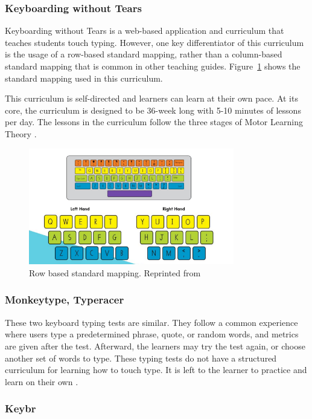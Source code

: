 \documentclass{report}
\begin{document}
\subsubsection{Keyboarding without Tears}

Keyboarding without Tears is a web-based application and curriculum that teaches
students touch typing. However, one key differentiator of this curriculum is the
usage of a row-based standard mapping, rather than a column-based standard
mapping that is common in other teaching guides. Figure~\ref{fig:kwt} shows the
standard mapping used in this curriculum.

This curriculum is self-directed and learners can learn at their own pace. At
its core, the curriculum is designed to be 36-week long with 5-10 minutes of
lessons per day. The lessons in the curriculum follow the three stages of
Motor Learning Theory \parencite{kwt}.

\begin{figure}[H]
	\centering
	\includegraphics[width=0.8\textwidth]{kwt.png}
	\caption{Row based standard mapping. Reprinted from }
	\label{fig:kwt}
	\centering
\end{figure}


\subsubsection{Monkeytype, Typeracer}

These two keyboard typing tests are similar. They follow a common experience
where users type a predetermined phrase, quote, or random words, and metrics are
given after the test. Afterward, the learners may try the test again, or choose
another set of words to type. These typing tests do not have a structured
curriculum for learning how to touch type. It is left to the learner to practice
and learn on their own \parencite{bartnik2021, typeracer}.

\subsubsection{Keybr}
\end{document}
